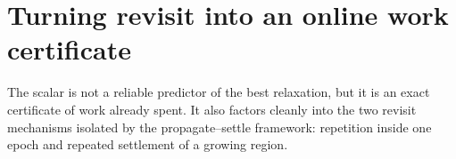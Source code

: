 \section{Turning revisit into an online work certificate}
\label{sec:revisit-certificate}

The scalar is not a reliable predictor of the best relaxation, but it is an
exact certificate of work already spent.  It also factors cleanly into the
two revisit mechanisms isolated by the propagate--settle framework:
repetition inside one epoch and repeated settlement of a growing region.
